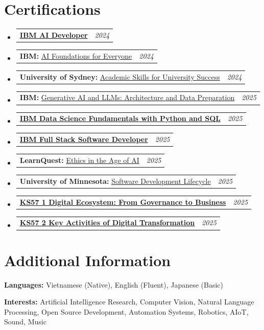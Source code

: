 \documentclass[a4paper,11pt]{article}
\makeatletter
\newcommand{\resumePOR}[3]{
\vspace{0.5mm}\item
    \begin{tabular*}{0.97\textwidth}[t]{l@{\extracolsep{\fill}}r}
        \textbf{#1}\hspace{0.3mm}#2 & \textit{\small{#3}} 
    \end{tabular*}
    \vspace{-2mm}
}
\newcommand{\resumeSubHeadingListStart}{\begin{itemize}[leftmargin=*,labelsep=1mm]}
\newcommand{\resumeSubHeadingListEnd}{\end{itemize}\vspace{2mm}}
\makeatother
\begin{document}
\section{\textbf{Certifications}}
\vspace{-0.2mm}
\resumeSubHeadingListStart
\resumePOR{}{\href{https://coursera.org/share/c1fb71cb3a0b59a0aa0f8c76057c2603}{
\textbf{IBM AI Developer}
}}{2024}
\resumePOR{}{
\textbf{IBM:} {{\href{https://coursera.org/share/8169e24718eed781c92938c2ffe772bb}{AI Foundations for Everyone}}}}{2024}
\resumePOR{}{
\textbf{University of Sydney:} {{\href{https://coursera.org/share/771cb2c52dca7ca350d4136333c396d6}{Academic Skills for University Success}}}}{2024}
\resumePOR{}{
\textbf{IBM:} {{\href{https://coursera.org/share/4a094a7d0de6c455a84f6331bc2e4136}{Generative AI and LLMs: Architecture and Data Preparation}}}}{2025}
\resumePOR{}{\href{https://coursera.org/share/6809d431388633d4225293975703fbf1}{
\textbf{IBM Data Science Fundamentals with Python and SQL}
}}{2025}
\resumePOR{}{\href{https://coursera.org/share/30d644b1e936b84f0ca0829c2784da96}{
\textbf{IBM Full Stack Software Developer}
}}{2025}
\resumePOR{}{
\textbf{LearnQuest:} {{\href{https://coursera.org/share/a34e6dde1e172ec9be2de7586de55f8b}{Ethics in the Age of AI}}}}{2025}
\resumePOR{}{
\textbf{University of Minnesota:} {{\href{https://coursera.org/share/82f6a487145c9ebd08a736c2f8ee370c}{Software Development Lifecycle}}}}{2025}
\resumePOR{}{\href{https://coursera.org/share/026ebbe85c28c15fd1ae2a2cecad505e}{
\textbf{KS57 1 Digital Ecosystem: From Governance to Business}
}}{2025}
\resumePOR{}{\href{https://coursera.org/share/d5f07bdb423a522cfe97755d85bf234c}{
\textbf{KS57 2 Key Activities of Digital Transformation}
}}{2025}

\resumeSubHeadingListEnd
\vspace{-4mm}

\section{\textbf{Additional Information}}
\vspace{-0.4mm}
\small{
\textbf{Languages:} Vietnamese (Native), English (Fluent), Japanese (Basic) 

\textbf{Interests:} Artificial Intelligence Research, Computer Vision, Natural Language Processing, Open Source Development, Automation Systems, Robotics, AIoT, Sound, Music
}

\vspace{-2mm}
\end{document}
